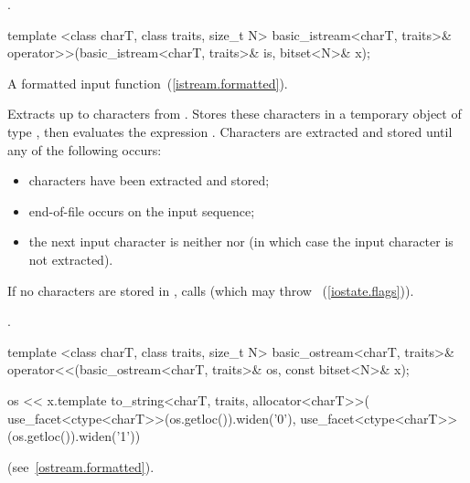 \begin{itemdescr}
\pnum
\returns
{}.
\end{itemdescr}

%
\begin{itemdecl}
template <class charT, class traits, size_t N>
  basic_istream<charT, traits>&
  operator>>(basic_istream<charT, traits>& is, bitset<N>& x);
\end{itemdecl}

\begin{itemdescr}
\pnum
A formatted input function~(\ref{istream.formatted}).

\pnum
\effects
Extracts up to  characters from .
Stores these characters in a temporary object  of type
,
then evaluates the expression
.
Characters are extracted and stored until any of the following occurs:

\begin{itemize}
\item
{} characters have been extracted and stored;
\item
end-of-file occurs on the input sequence;%
\item
the next input character is neither
nor
(in which case the input character is not extracted).
\end{itemize}

\pnum
If no characters are stored in , calls
(which may throw
~(\ref{iostate.flags})).

\pnum
\returns
{}.
\end{itemdescr}

%
\begin{itemdecl}
template <class charT, class traits, size_t N>
  basic_ostream<charT, traits>&
  operator<<(basic_ostream<charT, traits>& os, const bitset<N>& x);
\end{itemdecl}

\begin{itemdescr}
\pnum
\returns
\begin{codeblock}
os << x.template to_string<charT, traits, allocator<charT>>(
  use_facet<ctype<charT>>(os.getloc()).widen('0'),
  use_facet<ctype<charT>>(os.getloc()).widen('1'))
\end{codeblock}
(see~\ref{ostream.formatted}).
\end{itemdescr}

